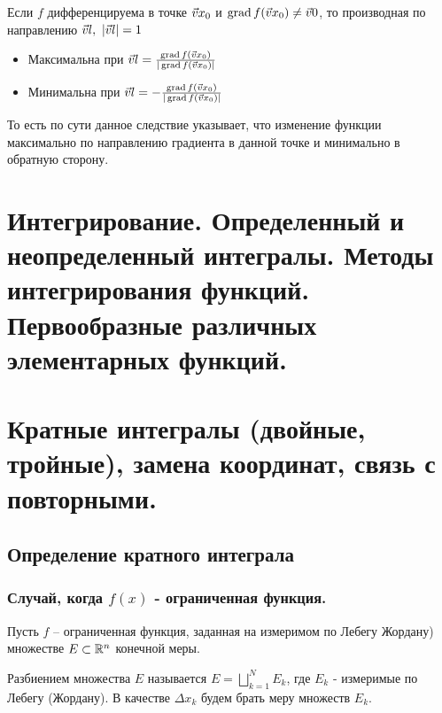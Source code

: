 \begin{multicols}{2}
    \cons 
	Если $f$ дифференцируема в точке $\vec{v}{x}_0$ и $\operatorname{grad} f(\vec{v}{x}_0) \neq \vec{v}{0}$, то производная по направлению $\vec{v}{l},\ |\vec{v}{l}| = 1$
	\begin{itemize}
		\item Максимальна при $\vec{v}{l} = \frac{\operatorname{grad} f(\vec{v}{x}_0)}{|\operatorname{grad} f(\vec{v}{x}_0)|}$
		
		\item Минимальна при $\vec{v}{l} = -\frac{\operatorname{grad} f(\vec{v}{x}_0)}{|\operatorname{grad} f(\vec{v}{x}_0)|}$
	\end{itemize}

\begin{note}{}{}
	То есть по сути данное следствие указывает, что изменение функции максимально по направлению градиента в данной точке и минимально в обратную сторону.
\end{note}
    \section{Интегрирование. Определенный и неопределенный интегралы. Методы интегрирования
    функций. Первообразные различных элементарных функций.}

    \section{Кратные интегралы (двойные, тройные), замена координат, связь с повторными.}
    \subsection*{Определение кратного интеграла}
\subsubsection*{Случай, когда $f(x)$ - ограниченная функция.}
\begin{definition}{}{}
Пусть $f$ -- ограниченная функция, заданная на измеримом по Лебегу Жордану) множестве $E \subset \mathbb{R}^n$ конечной меры. 

$\textbf{Разбиением}$ множества $E$ называется $E=\bigsqcup\limits_{k=1}^N E_k$, где $E_k$ - измеримые по Лебегу (Жордану). \newline В качестве $\Delta x_k$ будем брать меру множеств $E_k$. 


\end{definition}
\end{multicols}
